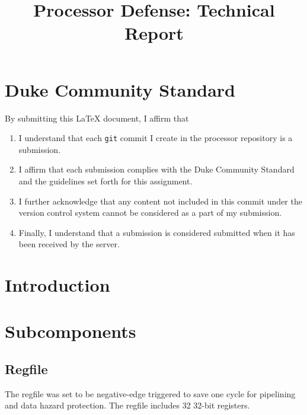 \documentclass[a4paper,11pt]{article}
\begin{document}



\title{Processor Defense: Technical Report}
\maketitle
\mbox{}
\vfill

\section*{Duke Community Standard}

By submitting this \LaTeX{} document, I affirm that
\begin{enumerate}
    \item I understand that each \texttt{git} commit I create in the processor repository is a submission.
    \item I affirm that each submission complies with the Duke Community Standard and the guidelines set forth for this assignment.
    \item I further acknowledge that any content not included in this commit under the version control system cannot be considered as a part of my submission.
    \item Finally, I understand that a submission is considered submitted when it has been received by the server.
\end{enumerate}

\newpage

\section*{Introduction}

\newpage

\section*{Subcomponents}

\subsection*{Regfile}
The regfile was set to be negative-edge triggered to save one cycle for pipelining and data hazard protection. The regfile includes 32 32-bit registers.
\end{document}
